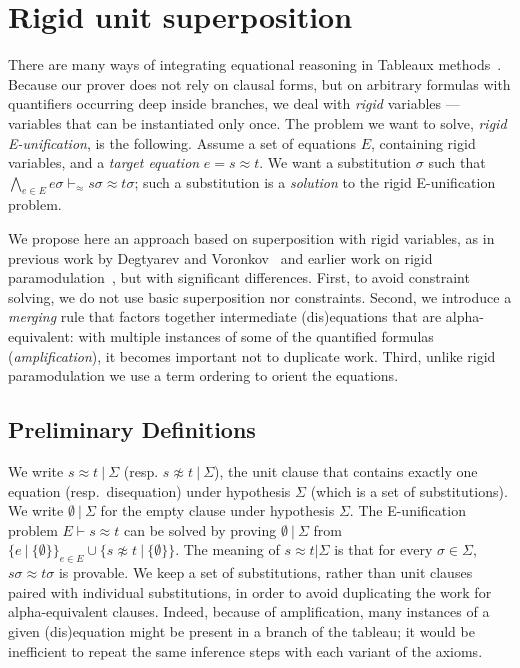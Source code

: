 
\section{Rigid unit superposition}

\EnableBpAbbreviations{}

\newcommand\clauseWithSubst[2]{\ensuremath{#1 ~|~ #2}}

There are many ways of integrating equational reasoning in
Tableaux methods~\cite{brand1975proving,letz2002integration,backeman2015theorem,degtyarev1996you}.
Because our prover does not rely on clausal forms, but on arbitrary formulas
with quantifiers occurring deep inside branches,
we deal with {\em rigid} variables --- variables that can be instantiated
only once.
The problem we want to solve, {\em rigid E-unification}, is the following.
Assume a set of equations $E$, containing rigid variables,
and a {\em target equation} $e = s \approx t$.
We want a substitution $\sigma$ such that
$\bigwedge_{e \in E} e\sigma \vdash_\approx s\sigma \approx t\sigma$;
such a substitution is a {\em solution} to the rigid E-unification problem.

We propose here an approach based on superposition with rigid variables,
as in previous work by Degtyarev and Voronkov~\cite{degtyarev1996you}
and earlier work on rigid paramodulation~\cite{plaisted1995special},
but with significant differences.
First, to avoid constraint solving, we do not use
basic superposition nor constraints.
Second, we introduce a {\em merging} rule that factors together
intermediate (dis)equations that are alpha-equivalent:
with multiple instances of some of the quantified formulas ({\em amplification}),
it becomes important not to duplicate work.
Third, unlike rigid paramodulation we use a term ordering to orient the
equations.

\subsection{Preliminary Definitions}


We write $ \clauseWithSubst{ s \approx t }{ \Sigma}$
(resp. $ \clauseWithSubst{ s \not\approx t }{ \Sigma}$),
the unit clause that contains exactly one equation (resp.~disequation)
under hypothesis $\Sigma$ (which is a set of substitutions).
We write $\clauseWithSubst{\emptyset}{\Sigma}$ for the empty clause under hypothesis $\Sigma$.
The E-unification problem $E \vdash s\approx t$ can be solved by
proving $\clauseWithSubst{\emptyset }{ \Sigma}$
from $\{ \clauseWithSubst{e }{ \{ \emptyset \} } \}_{ e \in E }
\cup
\{ \clauseWithSubst{s \not\approx t }{ \{ \emptyset \} } \}$.
The meaning of $s \approx t | \Sigma$ is that for every $\sigma \in \Sigma$,
$s\sigma \approx t\sigma$ is provable.
We keep a set of substitutions, rather than unit clauses paired with
individual substitutions, in order to avoid duplicating the work
for alpha-equivalent clauses.
Indeed, because of amplification, many instances of a given (dis)equation
might be present in a branch of the tableau;
it would be inefficient to repeat the same inference steps with each variant
of the axioms.

